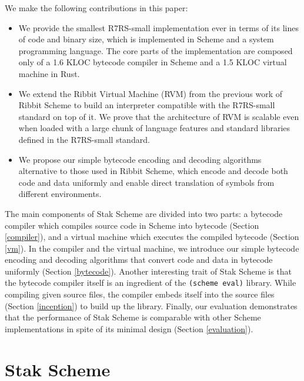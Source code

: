 \documentclass[sigplan]{acmart}
\begin{document}
We make the following contributions in this paper:

\begin{itemize}
  \item We provide the smallest R7RS-small implementation ever in
    terms of its lines of code and binary size, which is implemented
    in Scheme and a system programming language.
    The core parts of the implementation are composed only of a 1.6 KLOC
    bytecode compiler in Scheme and a 1.5 KLOC virtual machine in Rust.
  \item We extend the Ribbit Virtual Machine (RVM) from the previous
    work of Ribbit Scheme to build an interpreter compatible with the
    R7RS-small standard on top of it.
    We prove that the architecture of RVM is scalable even when
    loaded with a large chunk of language features and standard
    libraries defined in the R7RS-small standard.
  \item We propose our simple bytecode encoding and decoding algorithms
    alternative to those used in Ribbit Scheme, which encode and
    decode both code and data uniformly and enable direct translation
    of symbols from different environments.
\end{itemize}

The main components of Stak Scheme are divided into two parts:
a bytecode compiler which compiles source code in Scheme into
bytecode (Section \ref{compiler}),
and a virtual machine which executes the compiled bytecode
(Section \ref{vm}).
In the compiler and the virtual machine, we introduce our simple
bytecode encoding and
decoding algorithms that convert code and data in bytecode
uniformly (Section \ref{bytecode}).
Another interesting trait of Stak Scheme is that the bytecode compiler itself
is an ingredient of the \texttt{(scheme eval)} library.
While compiling given source files, the compiler embeds itself
into the source files (Section \ref{inception}) to build up the library.
Finally, our evaluation demonstrates that the performance of Stak Scheme is
comparable with other Scheme implementations in spite of its minimal
design (Section \ref{evaluation}).

\section{Stak Scheme}
\end{document}
